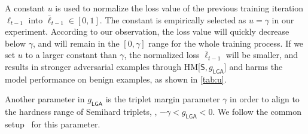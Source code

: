 \begin{table*}
	\caption{The efficacy of parameter $u$ for clipping loss value $\ell_{t-1}$.
	Stronger adversarial examples will be created for training if the loss value is not
	clipped (equivalent to setting $u$ to the theoretical upper bound of loss,
	\ie, 2.2).
	}
	\label{tab:u}
\end{table*}


A constant $u$ is used to normalize the loss value of the previous training
iteration $\ell_{t-1}$ into $\bar{\ell}_{t-1}\in[0,1]$.
%
The constant is empirically selected as $u=\gamma$ in our experiment.
%
According to our observation, the loss value will quickly decrease below
$\gamma$, and will remain in the $[0,\gamma]$ range for the whole training
process.
%
If we set $u$ to a larger constant than $\gamma$, the normalized loss
$\bar{\ell}_{t-1}$ will be smaller, and results in stronger adversarial
examples through HM[$\mathsf{S},g_\mathsf{LGA}$] and harms the model performance on benign examples,
as shown in \cref{tab:u}.

Another parameter in $g_\mathsf{LGA}$ is the triplet margin parameter $\gamma$
in order to align to the hardness range of Semihard triplets, \ie, $-\gamma<g_\mathsf{LGA}<0$.
%
We follow the common setup~\cite{revisiting} for this parameter.


